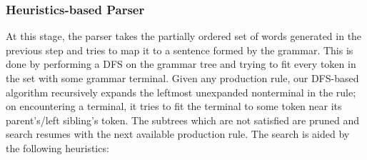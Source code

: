 \def\DevnagVersion{2.15}\documentclass[12pt]{article}
\begin{document}
\subsubsection{Heuristics-based Parser}
At this stage, the parser takes the partially ordered set of words generated in the previous step and tries to map it to a sentence formed by the grammar. This is done by performing a DFS on the grammar tree and trying to fit every token in the set with some grammar terminal. Given any production rule, our DFS-based algorithm recursively expands the leftmost unexpanded nonterminal in the rule; on encountering a terminal, it tries to fit the terminal to some token near its parent's/left sibling's token. The subtrees which are not satisfied are pruned and search resumes with the next available production rule. The search is aided by the following heuristics:
\end{document}
